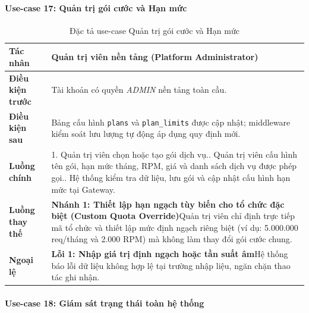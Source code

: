 \paragraph{Use-case 17: Quản trị gói cước và Hạn mức}

\begingroup
\small
\begin{longtable}{|p{3.2cm}|p{\dimexpr\linewidth-3.2cm-4\tabcolsep-3\arrayrulewidth\relax}|}
\caption{Đặc tả use-case Quản trị gói cước và Hạn mức}
\label{aihub:tab:uc_config_plans}\\
\hline
\textbf{Tác nhân} & Quản trị viên nền tảng (Platform Administrator) \\ \hline
\textbf{Điều kiện trước} & Tài khoản có quyền \textit{ADMIN} nền tảng toàn cầu. \\ \hline
\textbf{Điều kiện sau} & Bảng cấu hình \texttt{plans} và \texttt{plan\_limits} được cập nhật; middleware kiểm soát lưu lượng tự động áp dụng quy định mới. \\ \hline
\textbf{Luồng chính} & 1. Quản trị viên chọn hoặc tạo gói dịch vụ.\newline 2. Quản trị viên cấu hình tên gói, hạn mức tháng, RPM, giá và danh sách dịch vụ được phép gọi.\newline 3. Hệ thống kiểm tra dữ liệu, lưu gói và cập nhật cấu hình hạn mức tại Gateway. \\ \hline
\textbf{Luồng thay thế} &
\textbf{Nhánh 1: Thiết lập hạn ngạch tùy biến cho tổ chức đặc biệt (Custom Quota Override)}\newline Quản trị viên chỉ định trực tiếp mã tổ chức và thiết lập mức định ngạch riêng biệt (ví dụ: 5.000.000 req/tháng và 2.000 RPM) mà không làm thay đổi gói cước chung. \\ \hline
\textbf{Ngoại lệ} &
\textbf{Lỗi 1: Nhập giá trị định ngạch hoặc tần suất âm}\newline Hệ thống báo lỗi dữ liệu không hợp lệ tại trường nhập liệu, ngăn chặn thao tác ghi nhận. \\ \hline
\end{longtable}
\endgroup

\paragraph{Use-case 18: Giám sát trạng thái toàn hệ thống}

